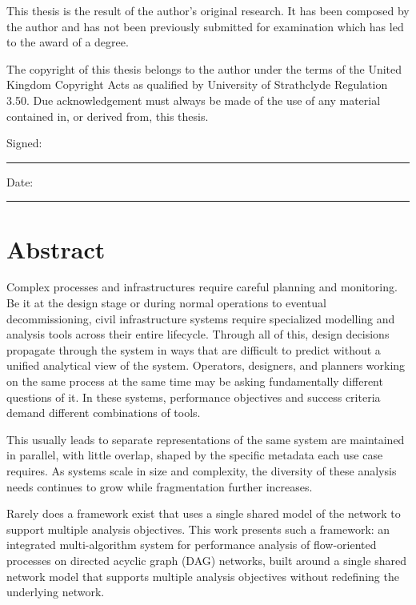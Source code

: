 \documentclass[12pt,a4paper,twoside]{report}
\begin{document}
This thesis is the result of the author's original research. It has been composed by the author and has not been previously submitted for examination which has led to the award of a degree.

The copyright of this thesis belongs to the author under the terms of the United Kingdom Copyright Acts as qualified by University of Strathclyde Regulation 3.50. Due acknowledgement must always be made of the use of any material contained in, or derived from, this thesis.

\vspace{2cm}

\noindent
Signed: \rule{5cm}{0.4pt}

\vspace{0.5cm}

\noindent
Date: \rule{5cm}{0.4pt}



\chapter*{Abstract}

Complex processes and infrastructures require careful planning and monitoring. Be it at the design stage or during normal operations to eventual decommissioning, civil infrastructure systems require specialized modelling and analysis tools across their entire lifecycle. Through all of this, design decisions propagate through the system in ways that are difficult to predict without a unified analytical view of the system. Operators, designers, and planners working on the same process at the same time may be asking fundamentally different questions of it. In these systems, performance objectives and success criteria demand different combinations of tools.

This usually leads to separate representations of the same system are maintained in parallel, with little overlap, shaped by the specific metadata each use case requires. As systems scale in size and complexity, the diversity of these analysis needs continues to grow while fragmentation further increases.

Rarely does a framework exist that uses a single shared model of the network to support multiple analysis objectives. This work presents such a framework: an integrated multi-algorithm system for performance analysis of flow-oriented processes on directed acyclic graph (DAG) networks, built around a single shared network model that supports multiple analysis objectives without redefining the underlying network.
\end{document}
